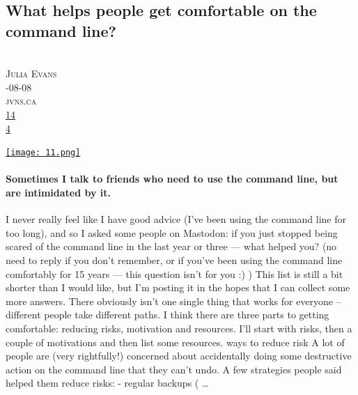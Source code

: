 \documentclass[10pt,a4paper]{article}
\begin{document}
\subsection{What helps people get comfortable on the command line?}
\noindent\begin{minipage}[t]{0.19\linewidth}
\vspace{0pt}
\noindent\scshape\footnotesize
\\ {\scriptsize\faUser}\space 
Julia Evans
\\ {\scriptsize\faCalendar}-08-08
\\ {\scriptsize\faGlobe}\space 
jvns.ca
\\ {\scriptsize\faThumbsOUp}\space 
\href{http://news.ycombinator.com/item?id=37174504\&utm\_term=comment}{14} 
\\ {\scriptsize\faComments}\space 
\href{http://news.ycombinator.com/item?id=37174504\&utm\_term=comment}{4} 
\end{minipage} 
\begin{minipage}[t]{0.80\linewidth}
\vspace{0pt}
\begin{multicols}{2}
    \href{https://jvns.ca/blog/2023/08/08/what-helps-people-get-comfortable-on-the-command-line-/?utm\_source=hackernewsletter\&utm\_medium=email\&utm\_term=fav}{
        \texttt{[image: 11.png]}
    }
\paragraph{Sometimes I talk to friends who need to use the command line, but are intimidated by it.}
 I never really feel like I have good advice (I’ve been using the command line for too long), and so I asked some people on Mastodon:
if you just stopped being scared of the command line in the last year or three — what helped you?
(no need to reply if you don’t remember, or if you’ve been using the command line comfortably for 15 years — this question isn’t for you :) )
This list is still a bit shorter than I would like, but I’m posting it in the hopes that I can collect some more answers. There obviously isn’t one single thing that works for everyone – different people take different paths.
I think there are three parts to getting comfortable: reducing risks, motivation and resources. I’ll start with risks, then a couple of motivations and then list some resources.
ways to reduce risk
A lot of people are (very rightfully!) concerned about accidentally doing some destructive action on the command line that they can’t undo.
A few strategies people said helped them reduce risks:
- regular backups (
\dots
\end{multicols}
\end{minipage}
\par\medskip
\newpage
\end{document}
